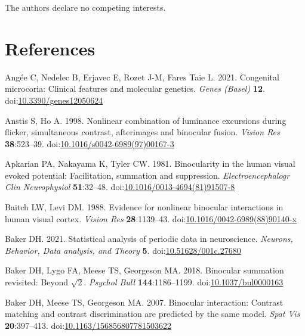 \documentclass[
]{article}
\begin{document}
The authors declare no competing interests.

\hypertarget{references}{%
\section{References}\label{references}}

\hypertarget{refs}{}
\leavevmode\hypertarget{ref-Angee2021}{}%
Angée C, Nedelec B, Erjavec E, Rozet J-M, Fares Taie L. 2021. Congenital microcoria: Clinical features and molecular genetics. \emph{Genes (Basel)} \textbf{12}. doi:\href{https://doi.org/10.3390/genes12050624}{10.3390/genes12050624}

\leavevmode\hypertarget{ref-Anstis1998}{}%
Anstis S, Ho A. 1998. Nonlinear combination of luminance excursions during flicker, simultaneous contrast, afterimages and binocular fusion. \emph{Vision Res} \textbf{38}:523--39. doi:\href{https://doi.org/10.1016/s0042-6989(97)00167-3}{10.1016/s0042-6989(97)00167-3}

\leavevmode\hypertarget{ref-Apkarian1981}{}%
Apkarian PA, Nakayama K, Tyler CW. 1981. Binocularity in the human visual evoked potential: Facilitation, summation and suppression. \emph{Electroencephalogr Clin Neurophysiol} \textbf{51}:32--48. doi:\href{https://doi.org/10.1016/0013-4694(81)91507-8}{10.1016/0013-4694(81)91507-8}

\leavevmode\hypertarget{ref-Baitch1988}{}%
Baitch LW, Levi DM. 1988. Evidence for nonlinear binocular interactions in human visual cortex. \emph{Vision Res} \textbf{28}:1139--43. doi:\href{https://doi.org/10.1016/0042-6989(88)90140-x}{10.1016/0042-6989(88)90140-x}

\leavevmode\hypertarget{ref-Baker2021}{}%
Baker DH. 2021. Statistical analysis of periodic data in neuroscience. \emph{Neurons, Behavior, Data analysis, and Theory} \textbf{5}. doi:\href{https://doi.org/10.51628/001c.27680}{10.51628/001c.27680}

\leavevmode\hypertarget{ref-Baker2018}{}%
Baker DH, Lygo FA, Meese TS, Georgeson MA. 2018. Binocular summation revisited: Beyond \(\sqrt{2}\). \emph{Psychol Bull} \textbf{144}:1186--1199. doi:\href{https://doi.org/10.1037/bul0000163}{10.1037/bul0000163}

\leavevmode\hypertarget{ref-Baker2007}{}%
Baker DH, Meese TS, Georgeson MA. 2007. Binocular interaction: Contrast matching and contrast discrimination are predicted by the same model. \emph{Spat Vis} \textbf{20}:397--413. doi:\href{https://doi.org/10.1163/156856807781503622}{10.1163/156856807781503622}
\end{document}
